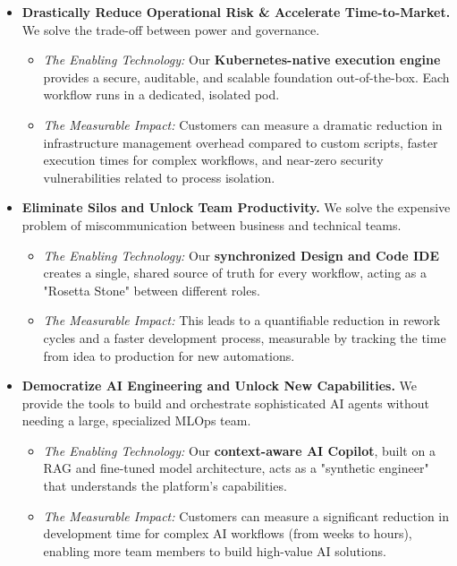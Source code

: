 \documentclass[11pt, a4paper, oneside]{article}
\begin{document}
\begin{itemize}
    \item \textbf{Drastically Reduce Operational Risk \& Accelerate Time-to-Market.} We solve the trade-off between power and governance.
    \begin{itemize}
        \item \textit{The Enabling Technology:} Our \textbf{Kubernetes-native execution engine} provides a secure, auditable, and scalable foundation out-of-the-box. Each workflow runs in a dedicated, isolated pod.
        \item \textit{The Measurable Impact:} Customers can measure a dramatic reduction in infrastructure management overhead compared to custom scripts, faster execution times for complex workflows, and near-zero security vulnerabilities related to process isolation.
    \end{itemize}

    \item \textbf{Eliminate Silos and Unlock Team Productivity.} We solve the expensive problem of miscommunication between business and technical teams.
    \begin{itemize}
        \item \textit{The Enabling Technology:} Our \textbf{synchronized Design and Code IDE} creates a single, shared source of truth for every workflow, acting as a "Rosetta Stone" between different roles.
        \item \textit{The Measurable Impact:} This leads to a quantifiable reduction in rework cycles and a faster development process, measurable by tracking the time from idea to production for new automations.
    \end{itemize}

    \item \textbf{Democratize AI Engineering and Unlock New Capabilities.} We provide the tools to build and orchestrate sophisticated AI agents without needing a large, specialized MLOps team.
    \begin{itemize}
        \item \textit{The Enabling Technology:} Our \textbf{context-aware AI Copilot}, built on a RAG and fine-tuned model architecture, acts as a "synthetic engineer" that understands the platform's capabilities.
        \item \textit{The Measurable Impact:} Customers can measure a significant reduction in development time for complex AI workflows (from weeks to hours), enabling more team members to build high-value AI solutions.
    \end{itemize}
    

\end{itemize}
\end{document}
